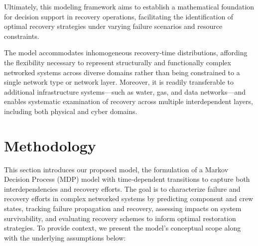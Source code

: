 \documentclass[conference]{IEEEtran}
\begin{document}
Ultimately, this modeling framework aims to establish a mathematical foundation for decision support in recovery operations, facilitating the identification of optimal recovery strategies under varying failure scenarios and resource constraints.

The model accommodates inhomogeneous recovery‑time distributions, affording the flexibility necessary to represent structurally and functionally complex networked systems across diverse domains rather than being constrained to a single network type or network layer. Moreover, it is readily transferable to additional infrastructure systems—such as water, gas, and data networks—and enables systematic examination of recovery across multiple interdependent layers, including both physical and cyber domains.


\section{Methodology}

This section introduces our proposed model, the formulation of a Markov Decision Process (MDP) model with time‑dependent transitions to capture both interdependencies and recovery efforts. The goal is to characterize failure and recovery efforts in complex networked systems by predicting component and crew states, tracking failure propagation and recovery, assessing impacts on system survivability, and evaluating recovery schemes to inform optimal restoration strategies. To provide context, we present the model’s conceptual scope along with the underlying assumptions below:
\end{document}
